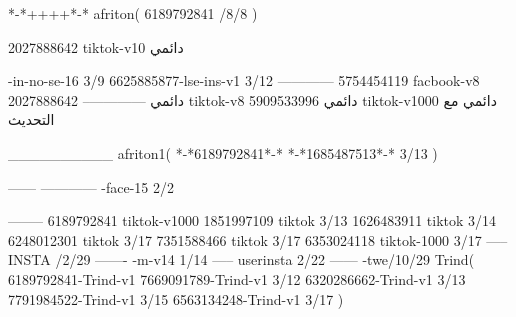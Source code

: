 *-*++++*-*
afriton(
6189792841 /8/8
)

2027888642 tiktok-v10
دائمي

-in-no-se-16 3/9
6625885877-lse-ins-v1 3/12
------------
5754454119 facbook-v8
دائمي
--------------
2027888642 tiktok-v8
دائمي
5909533996 tiktok-v1000
دائمي مع التحديث

__________
afriton1(
*-*6189792841*-*
*-*1685487513*-* 3/13
)


------
------------
-face-15 2/2

--------
6189792841 tiktok-v1000
1851997109 tiktok 3/13
1626483911 tiktok 3/14
6248012301 tiktok 3/17
7351588466 tiktok 3/17
6353024118 tiktok-1000 3/17
-----
 INSTA /2/29
-------
-m-v14 1/14
-----
userinsta 2/22
------
-twe/10/29
Trind(
6189792841-Trind-v1 
7669091789-Trind-v1 3/12
6320286662-Trind-v1 3/13
7791984522-Trind-v1 3/15
6563134248-Trind-v1 3/17
)
